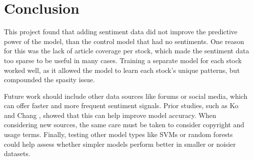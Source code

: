\newpage

\section{Conclusion}

This project found that adding sentiment data did not improve the predictive power of the model, than the control model that had no sentiments. One reason for this was the lack of article coverage per stock, which made the sentiment data too sparse to be useful in many cases. Training a separate model for each stock worked well, as it allowed the model to learn each stock’s unique patterns, but compounded the spasity issue.

Future work should include other data sources like forums or social media, which can offer faster and more frequent sentiment signals. Prior studies, such as Ko and Chang \cite{ko_lstm}, showed that this can help improve model accuracy. When considering new sources, the same care must be taken to consider copyright and usage terms. Finally, testing other model types like SVMs or random forests could help assess whether simpler models perform better in smaller or noisier datasets.

